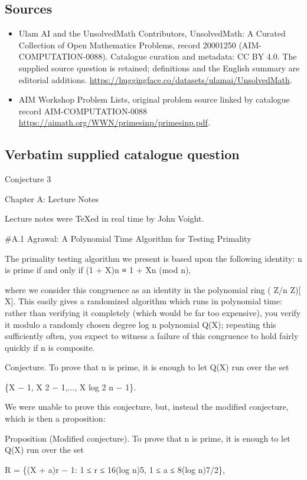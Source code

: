\documentclass[11pt]{article}
\begin{document}
\subsection{Sources}
\begin{itemize}
\item[S1] Ulam AI and the UnsolvedMath Contributors, UnsolvedMath: A Curated Collection of Open Mathematics Problems, record 20001250 (AIM-COMPUTATION-0088). Catalogue curation and metadata: CC BY 4.0. The supplied source question is retained; definitions and the English summary are editorial additions.
\url{https://huggingface.co/datasets/ulamai/UnsolvedMath}.
\item[S2] AIM Workshop Problem Lists, original problem source linked by catalogue record AIM-COMPUTATION-0088
\url{https://aimath.org/WWN/primesinp/primesinp.pdf}.
\end{itemize}
\subsection{Verbatim supplied catalogue question}
Conjecture 3

Chapter A: Lecture Notes

Lecture notes were TeXed in real time by John Voight.

\#A.1 Agrawal: A Polynomial Time Algorithm for Testing Primality

The primality testing algorithm we present is based upon the following identity: n is prime if and only if (1 + X)n ≡ 1 + Xn (mod n),

where we consider this congruence as an identity in the polynomial ring ( Z/n Z)[ X]. This easily gives a randomized algorithm which runs in polynomial time: rather than verifying it completely (which would be far too expensive), you verify it modulo a randomly chosen degree log n polynomial Q(X); repeating this sufficiently often, you expect to witness a failure of this congruence to hold fairly quickly if n is composite.

Conjecture. To prove that n is prime, it is enough to let Q(X) run over the set

\{X − 1, X 2 − 1,..., X log 2 n − 1\}.

We were unable to prove this conjecture, but, instead the modified conjecture, which is then a proposition:

Proposition (Modified conjecture). To prove that n is prime, it is enough to let Q(X) run over the set

R = \{(X + a)r − 1: 1 ≤ r ≤ 16(log n)5, 1 ≤ a ≤ 8(log n)7/2\},
\end{document}
